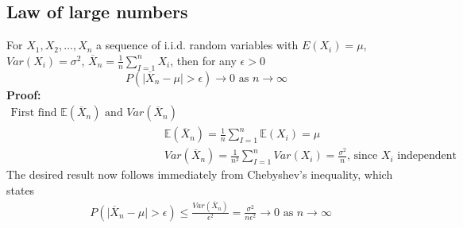 \documentclass{article}
\newcommand{\abs}[1]{\lvert#1\rvert}
\begin{document}
\subsection{Law of large numbers}
For $X_1, X_2, \dots, X_n$ a sequence of i.i.d. random variables with $E(X_i) = \mu$,  $Var(X_i) = \sigma^2$, $\overline{X}_n = \frac{1}{n}\sum_{I = 1}^n X_i$, then for any $\epsilon > 0$
\begin{equation*}
	P(\abs{\overline{X}_n - \mu} > \epsilon) \longrightarrow 0 \textrm{ as } n \rightarrow \infty
\end{equation*}
\textbf{Proof:}
\begin{align*}
	\textrm{First find $\mathbb{E}(\overline{X}_n)$ and $Var(\overline{X}_n)$} \\
	& \mathbb{E}(\overline{X}_n) = \frac{1}{n}\sum_{I = 1}^n \mathbb{E}(X_i) = \mu \\
	& Var(\overline{X}_n) = \frac{1}{n^2}\sum_{I = 1}^nVar(X_i) = \frac{\sigma^2}{n} \textrm{, since $X_i$ independent}
\end{align*}
The desired result now follows immediately from Chebyshev’s inequality, which states
\begin{align*}
	& P(\abs{\overline{X}_n - \mu} > \epsilon) \leq \frac{Var(\overline{X}_n)}{\epsilon^2} = \frac{\sigma^2}{n\epsilon^2} \rightarrow 0 \textrm{ as } n \rightarrow \infty
\end{align*}
\end{document}
